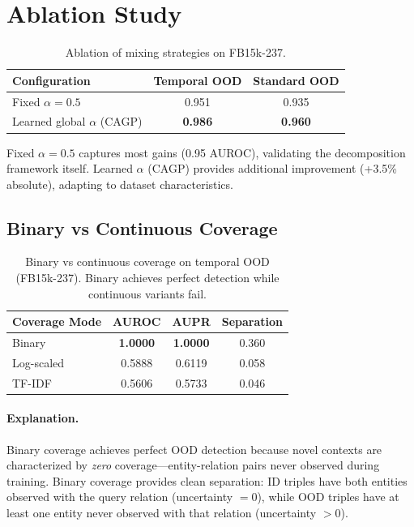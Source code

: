 \documentclass[accepted]{uai2024}  %
\begin{document}
\section{Ablation Study}
\label{app:ablation}

\begin{table}[h]
\centering
\caption{Ablation of mixing strategies on FB15k-237.}
\begin{tabular}{lcc}
\toprule
Configuration & Temporal OOD & Standard OOD \\
\midrule
Fixed $\alpha = 0.5$ & 0.951 & 0.935 \\
Learned global $\alpha$ (CAGP) & \textbf{0.986} & \textbf{0.960} \\
\bottomrule
\end{tabular}
\end{table}

Fixed $\alpha = 0.5$ captures most gains (0.95 AUROC), validating the decomposition framework itself. Learned $\alpha$ (CAGP) provides additional improvement (+3.5\% absolute), adapting to dataset characteristics.

\subsection{Binary vs Continuous Coverage}
\label{app:coverage_ablation}

\begin{table}[h]
\centering
\caption{Binary vs continuous coverage on temporal OOD (FB15k-237). Binary achieves perfect detection while continuous variants fail.}
\label{tab:coverage_ablation}
\begin{tabular}{lccc}
\toprule
Coverage Mode & AUROC & AUPR & Separation \\
\midrule
Binary & \textbf{1.0000} & \textbf{1.0000} & 0.360 \\
Log-scaled & 0.5888 & 0.6119 & 0.058 \\
TF-IDF & 0.5606 & 0.5733 & 0.046 \\
\bottomrule
\end{tabular}
\end{table}

\paragraph{Explanation.}
Binary coverage achieves perfect OOD detection because novel contexts are characterized by \emph{zero} coverage---entity-relation pairs never observed during training. Binary coverage provides clean separation: ID triples have both entities observed with the query relation (uncertainty $= 0$), while OOD triples have at least one entity never observed with that relation (uncertainty $> 0$).
\end{document}
